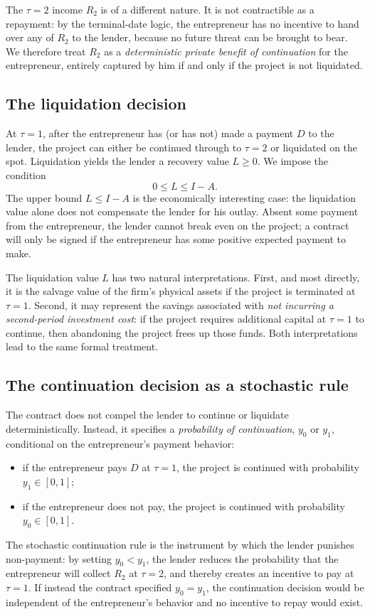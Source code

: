 \documentclass[11pt,a4paper,oneside]{book}
\def\leq{\leqslant}
\def\geq{\geqslant}
\theoremstyle{plain}
\theoremstyle{definition}
\theoremstyle{remark}
\numberwithin{equation}{chapter}
\begin{document}
The $\tau = 2$ income $R_2$ is of a different nature.
It is not contractible as a repayment: by the terminal-date logic, the entrepreneur has no incentive to hand over any of $R_2$ to the lender, because no future threat can be brought to bear.
We therefore treat $R_2$ as a \emph{deterministic private benefit of continuation} for the entrepreneur, entirely captured by him if and only if the project is not liquidated.

\subsection{The liquidation decision}

At $\tau = 1$, after the entrepreneur has (or has not) made a payment $D$ to the lender, the project can either be continued through to $\tau = 2$ or liquidated on the spot.
Liquidation yields the lender a recovery value $L \geq 0$.
We impose the condition
\begin{equation}\label{eq:NV-L-bound}
  0 \leq L \leq I - A.
\end{equation}
The upper bound $L \leq I - A$ is the economically interesting case: the liquidation value alone does not compensate the lender for his outlay.
Absent some payment from the entrepreneur, the lender cannot break even on the project; a contract will only be signed if the entrepreneur has some positive expected payment to make.

The liquidation value $L$ has two natural interpretations.
First, and most directly, it is the salvage value of the firm's physical assets if the project is terminated at $\tau = 1$.
Second, it may represent the savings associated with \emph{not incurring a second-period investment cost}: if the project requires additional capital at $\tau = 1$ to continue, then abandoning the project frees up those funds.
Both interpretations lead to the same formal treatment.

\subsection{The continuation decision as a stochastic rule}

The contract does not compel the lender to continue or liquidate deterministically.
Instead, it specifies a \emph{probability of continuation}, $y_0$ or $y_1$, conditional on the entrepreneur's payment behavior:
\begin{itemize}
  \item if the entrepreneur pays $D$ at $\tau = 1$, the project is continued with probability $y_1 \in [0, 1]$;
  \item if the entrepreneur does not pay, the project is continued with probability $y_0 \in [0, 1]$.
\end{itemize}
The stochastic continuation rule is the instrument by which the lender punishes non-payment: by setting $y_0 < y_1$, the lender reduces the probability that the entrepreneur will collect $R_2$ at $\tau = 2$, and thereby creates an incentive to pay at $\tau = 1$.
If instead the contract specified $y_0 = y_1$, the continuation decision would be independent of the entrepreneur's behavior and no incentive to repay would exist.
\end{document}
